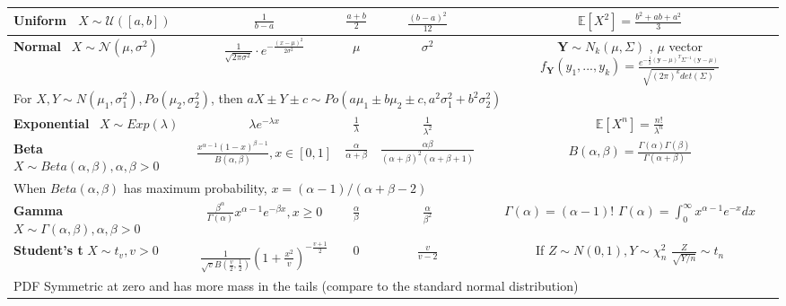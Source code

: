 \documentclass[9pt]{article}
\begin{document}
\begin{longtable}{|l||c|c|c|c|}
    \hline
    {\textbf{Uniform} \ $X\sim \mathcal{U}([a,b])$} & $\frac{1}{b-a}$ & $\frac{a+b}{2}$ & $\frac{(b-a)^2}{12}$ & $\mathbb{E}[X^2]=\frac{b^2+ab+a^2}{3}$ \\
    \hline
    {\textbf{Normal} \ $X\sim \mathcal{N}(\mu,\sigma^2)$} & $\frac{1}{\sqrt{2\pi \sigma^2}}\cdot e^{-\frac{(x-\mu)^2}{2\sigma^2}}$ & $\mu$ & $\sigma^2$ & \makecell{$\mathbf{Y}\sim N_k(\mu,\Sigma)$ , $\mu$ vector  \\ $f_{\mathbf{Y}}(y_1,...,y_k)=\frac{e^{-\frac{1}{2}(\mathbf{y}-\mu)^T\Sigma^{-1}(\mathbf{y}-\mu)}}{\sqrt{(2\pi)^kdet(\Sigma)}} $}\\
    \hline
    \multicolumn{5}{|l|}{For $X,Y\sim N(\mu_1,\sigma^2_1),Po(\mu_2,\sigma^2_2)$, then $aX\pm Y\pm c\sim Po(a\mu_1\pm b\mu_2\pm c,a^2\sigma^2_1+b^2\sigma^2_2)$} \\
    \hline
    {\textbf{Exponential} \ $X\sim Exp(\lambda)$} & $\lambda e^{-\lambda x}$ & $\frac{1}{\lambda}$ & $\frac{1}{\lambda^2}$ & $\mathbb{E}[X^n]=\frac{n!}{\lambda^n}$ \\
    \hline
    \makecell{\textbf{Beta} \\ $X\sim Beta(\alpha,\beta),\alpha,\beta >0$} & $\frac{x^{\alpha-1}(1-x)^{\beta-1}}{B(\alpha,\beta)},x\in[0,1]$ & $\frac{\alpha}{\alpha +\beta}$ & $\frac{\alpha\beta}{(\alpha+\beta)^2(\alpha+\beta+1)}$ & $B(\alpha,\beta)=\frac{\Gamma(\alpha)\Gamma(\beta)}{\Gamma(\alpha+\beta)}$ \\
    \hline
    \multicolumn{5}{|l|}{When $Beta(\alpha,\beta)$ has maximum probability, $x=(\alpha-1)/(\alpha+\beta-2)$} \\
    \hline
    \makecell{\textbf{Gamma} \\ $X\sim \Gamma(\alpha,\beta),\alpha,\beta >0$} & $\frac{\beta^\alpha}{\Gamma(\alpha)}x^{\alpha-1}e^{-\beta x},x\geq0$ & $\frac{\alpha}{\beta}$ & $\frac{\alpha}{\beta^2}$ & \makecell{ $\Gamma(\alpha)=(\alpha -1)!$ \\ $\Gamma(\alpha)=\int^\infty_0x^{\alpha-1}e^{-x}dx$} \\
    \hline
    \makecell{\textbf{Student's t} \\ $X\sim t_v,v>0$} & $\frac{1}{\sqrt{v}B(\frac{v}{2},\frac{1}{2})}(1+\frac{x^2}{v})^{-\frac{v+1}{2}}$ & $0$ & $\frac{v}{v-2}$ & \makecell{If $Z\sim N(0,1),Y\sim \chi^2_n$ \\ $\frac{Z}{\sqrt{Y/n}}\sim t_n$} \\
    \hline
    \multicolumn{5}{|l|}{PDF Symmetric at zero and has more mass in the tails (compare to the standard normal distribution)} \\

\end{longtable}
\end{document}

